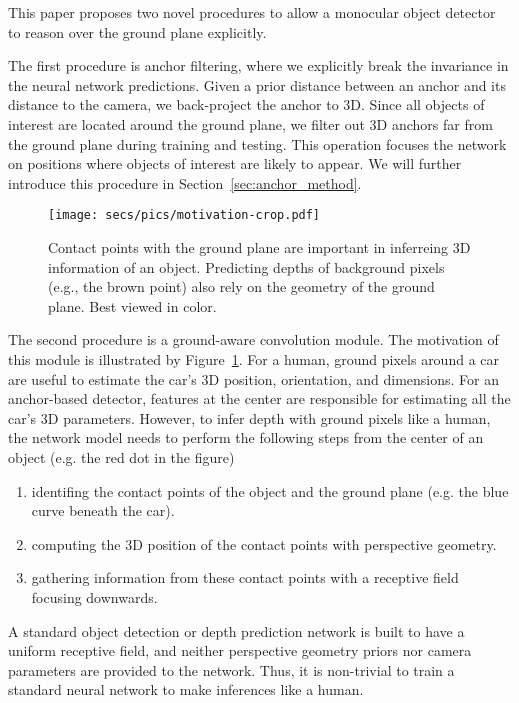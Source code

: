 \documentclass[letterpaper, 10 pt, journal, twoside]{IEEEtran}
\begin{document}
This paper proposes two novel procedures to allow a monocular object detector to reason over the ground plane explicitly.

The first procedure is anchor filtering, where we explicitly break the invariance in the neural network predictions. Given a prior distance between an anchor and its distance to the camera, we back-project the anchor to 3D. Since all objects of interest are located around the ground plane, we filter out 3D anchors far from the ground plane during training and testing. This operation focuses the network on positions where objects of interest are likely to appear. We will further introduce this procedure in Section~\ref{sec:anchor_method}.

\begin{figure}
  \centering
    \texttt{[image: secs/pics/motivation-crop.pdf]}
    \caption{Contact points with the ground plane are important in inferreing 3D information of an object. Predicting depths of background pixels (e.g., the brown point) also rely on the geometry of the ground plane. Best viewed in color.}
    \label{fig:motivation}
  \end{figure} 
The second procedure is a ground-aware convolution module. The motivation of this module is illustrated by Figure~\ref{fig:motivation}. For a human, ground pixels around a car are useful to estimate the car's 3D position, orientation, and dimensions. For an anchor-based detector, features at the center are responsible for estimating all the car's 3D parameters.  However, to infer depth with ground pixels like a human, the network model needs to perform the following steps from the center of an object (e.g. the red dot in the figure) \begin{enumerate}
    \item identifing the contact points of the object and the ground plane (e.g. the blue curve beneath the car).
    \item computing the 3D position of the contact points with perspective geometry.
    \item gathering information from these contact points with a receptive field focusing downwards.
\end{enumerate}

A standard object detection or depth prediction network is built to have a uniform receptive field, and neither perspective geometry priors nor camera parameters are provided to the network. Thus, it is non-trivial to train a standard neural network to make inferences like a human.
\end{document}
